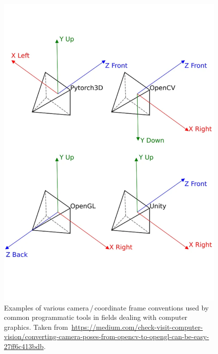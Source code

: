 \begin{figure}
    \centering
    \includegraphics[width=.7\textwidth]{../graphics/cs_conventions.png}
    \caption[Examples of various camera\,/\,coordinate frame conventions]{
    Examples of various camera\,/\,coordinate frame conventions used by
    common programmatic tools in fields dealing with computer graphics.
    Taken from~\url{https://medium.com/check-visit-computer-vision/converting-camera-poses-from-opencv-to-opengl-can-be-easy-27ff6c413bdb}.}\label{fig:cs_conventions}
\end{figure}

